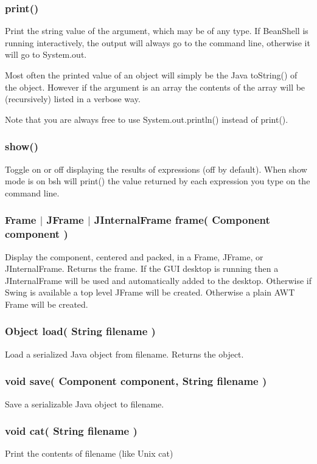 \documentclass[twoside,11pt]{article}
\renewcommand{\_}{\texttt{\symbol{95}}}
\begin{document}
\subsubsection*{print()}
Print the string value of the argument, which may be of any type.
If BeanShell is running interactively, the output will always go to the
command line, otherwise it will go to System.out.

Most often the printed value of an object will simply be the Java
toString() of the object.  However if the argument is an array the contents
of the array will be (recursively) listed in a verbose way.

Note that you are always free to use System.out.println() instead of print().

\subsubsection*{show()}
Toggle on or off displaying the results of expressions (off by default).
When show mode is on bsh will print() the value returned by each expression
you type on the command line.

\subsubsection*{Frame $|$ JFrame $|$ JInternalFrame frame( Component component )}
Display the component, centered and packed, in a Frame, JFrame, or
JInternalFrame.  Returns the frame.  If the GUI desktop is running then a
JInternalFrame will be used and automatically added to the desktop.  Otherwise
if Swing is available a top level JFrame will be created.  Otherwise a plain
AWT Frame will be created.

\subsubsection*{Object load( String filename )}
Load a serialized Java object from filename.  Returns the object.

\subsubsection*{void save( Component component, String filename )}
Save a serializable Java object to filename.

\subsubsection*{void cat( String filename )}
Print the contents of filename (like Unix cat)
\end{document}
